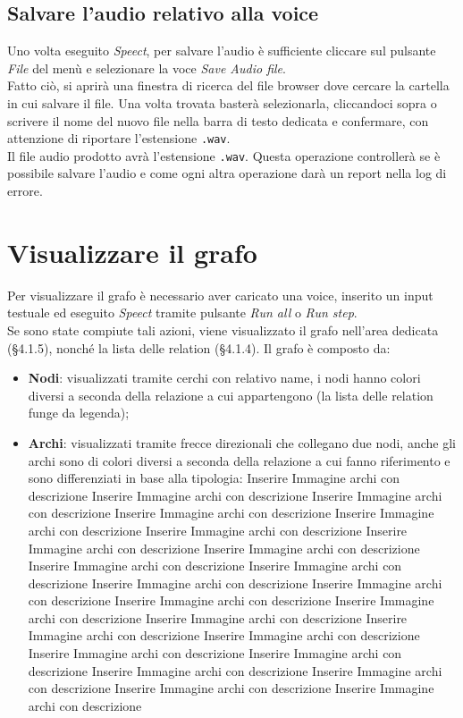 \documentclass[openany,12pt,a4paper]{report}
\begin{document}
	
	\subsection{Salvare l'audio relativo alla voice}
	Uno volta eseguito \textit{Speect}, per salvare l'audio è sufficiente cliccare sul pulsante \textit{File} del menù e selezionare la voce \textit{Save Audio file}.\\
	Fatto ciò, si aprirà una finestra di ricerca del file browser dove cercare la cartella in cui salvare il file. Una volta trovata basterà selezionarla, cliccandoci sopra o scrivere il nome del nuovo file nella barra di testo dedicata e confermare, con attenzione di riportare l'estensione \verb|.wav|.\\
	Il file audio prodotto avrà l'estensione \verb|.wav|.
	Questa operazione controllerà se è possibile salvare l'audio e come ogni altra operazione darà un report nella log di errore.
	
	\section{Visualizzare il grafo}
	Per visualizzare il grafo è necessario aver caricato una voice, inserito un input testuale ed eseguito \textit{Speect} tramite pulsante \textit{Run all} o \textit{Run step}.\\
	Se sono state compiute tali azioni, viene visualizzato il grafo nell'area dedicata (§4.1.5), nonché la lista delle relation (§4.1.4).
	Il grafo è composto da:
	\begin{itemize}
		\item \textbf{Nodi}: visualizzati tramite cerchi con relativo name, i nodi hanno colori diversi a seconda della relazione a cui appartengono (la lista delle relation funge da legenda);
		\item \textbf{Archi}: visualizzati tramite frecce direzionali che collegano due nodi, anche gli archi sono di colori diversi a seconda della relazione a cui fanno riferimento e sono differenziati in base alla tipologia:
		Inserire Immagine archi con descrizione	Inserire Immagine archi con descrizione	Inserire Immagine archi con descrizione	Inserire Immagine archi con descrizione	Inserire Immagine archi con descrizione	Inserire Immagine archi con descrizione	Inserire Immagine archi con descrizione	Inserire Immagine archi con descrizione	Inserire Immagine archi con descrizione	Inserire Immagine archi con descrizione	Inserire Immagine archi con descrizione	Inserire Immagine archi con descrizione	Inserire Immagine archi con descrizione	Inserire Immagine archi con descrizione	Inserire Immagine archi con descrizione	Inserire Immagine archi con descrizione	Inserire Immagine archi con descrizione	Inserire Immagine archi con descrizione	Inserire Immagine archi con descrizione	Inserire Immagine archi con descrizione	Inserire Immagine archi con descrizione	Inserire Immagine archi con descrizione	Inserire Immagine archi con descrizione
	\end{itemize}
	
\end{document}
